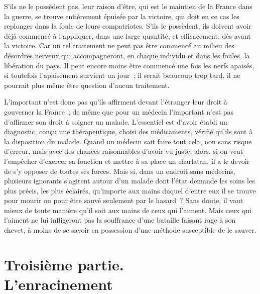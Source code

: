 \documentclass[french,twoside]{book} %
\begin{document}
S'ils ne le possèdent pas, leur raison d'être, qui est le maintien de la France dans la guerre, se trouve entièrement épuisée par la victoire, qui doit en ce cas les replonger dans la foule de leurs compatriotes. S'ils le possèdent, ils doivent avoir déjà commencé à l'appliquer, dans une large quantité, et efficacement, dès avant la victoire. Car un tel traitement ne peut pas être commencé au milieu des désordres nerveux qui accompagneront, en chaque individu et dans les foules, la libération du pays. Il peut encore moins être commencé une fois les nerfs apaisés, si toutefois l'apaisement survient un jour ; il serait beaucoup trop tard, il ne pourrait plus même être question d'aucun traitement.\par
L'important n'est donc pas qu'ils affirment devant l'étranger leur droit à gouverner la France ; de même que pour un médecin l'important n'est pas d'affirmer son droit à soigner un malade. L'essentiel est d'avoir établi un diagnostic, conçu une thérapeutique, choisi des médicaments, vérifié qu'ils sont à la disposition du malade. Quand un médecin sait faire tout cela, non sans risque d'erreur, mais avec des chances raisonnables d'avoir vu juste, alors, si on veut l'empêcher d'exercer sa fonction et mettre à sa place un charlatan, il a le devoir de s'y opposer de toutes ses forces. Mais si, dans un endroit sans médecins, plusieurs ignorants s'agitent autour d'un malade dont l'état demande les soins les plus précis, les plus éclairés, qu'importe aux mains duquel d'entre eux il se trouve pour mourir ou pour être sauvé seulement par le hasard ? Sans doute, il vaut mieux de toute manière qu'il soit aux mains de ceux qui l'aiment. Mais ceux qui l'aiment ne lui infligeront pas la souffrance d'une bataille faisant rage à son chevet, à moins de se savoir en possession d'une méthode susceptible de le sauver.
\section[{Troisième partie. L’enracinement}]{Troisième partie. \\
L’enracinement}\renewcommand{\leftmark}{Troisième partie. \\
L’enracinement}
\end{document}
